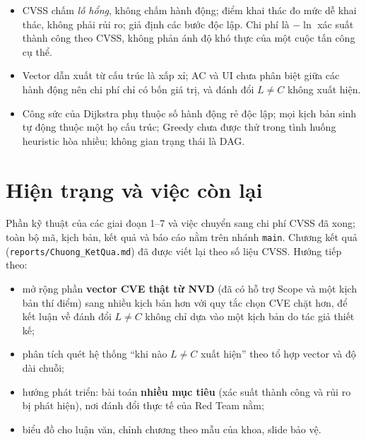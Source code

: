 \documentclass[11pt,a4paper]{article}
\begin{document}
\begin{itemize}
  \item CVSS chấm \emph{lỗ hổng}, không chấm hành động; điểm khai thác đo mức dễ khai thác, không phải rủi ro; giả định các bước độc lập. Chi phí là $-\ln$ xác suất thành công theo CVSS, không phản ánh độ khó thực của một cuộc tấn công cụ thể.
  \item Vector dẫn xuất từ cấu trúc là xấp xỉ; AC và UI chưa phân biệt giữa các hành động nên chi phí chỉ có bốn giá trị, và đánh đổi $L\neq C$ không xuất hiện.
  \item Công sức của Dijkstra phụ thuộc số hành động rẻ độc lập; mọi kịch bản sinh tự động thuộc một họ cấu trúc; Greedy chưa được thử trong tình huống heuristic hòa nhiều; không gian trạng thái là DAG.
\end{itemize}

\section{Hiện trạng và việc còn lại}

Phần kỹ thuật của các giai đoạn 1--7 và việc chuyển sang chi phí CVSS đã xong; toàn bộ mã, kịch bản, kết quả và báo cáo nằm trên nhánh \texttt{main}. Chương kết quả (\texttt{reports/Chuong\_KetQua.md}) đã được viết lại theo số liệu CVSS. Hướng tiếp theo:

\begin{itemize}
  \item mở rộng phần \textbf{vector CVE thật từ NVD} (đã có hỗ trợ Scope và một kịch bản thí điểm) sang nhiều kịch bản hơn với quy tắc chọn CVE chặt hơn, để kết luận về đánh đổi $L\neq C$ không chỉ dựa vào một kịch bản do tác giả thiết kế;
  \item phân tích quét hệ thống ``khi nào $L\neq C$ xuất hiện'' theo tổ hợp vector và độ dài chuỗi;
  \item hướng phát triển: bài toán \textbf{nhiều mục tiêu} (xác suất thành công và rủi ro bị phát hiện), nơi đánh đổi thực tế của Red Team nằm;
  \item biểu đồ cho luận văn, chỉnh chương theo mẫu của khoa, slide bảo vệ.
\end{itemize}
\end{document}
